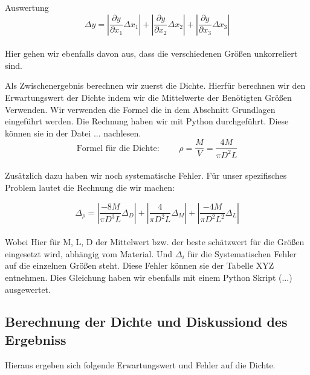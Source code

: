 \documentclass[twoside]{protokoll}
\begin{document}
\begin{aufgabe}{Auswertung}
\begin{equation}
	\Delta y = \left|\frac{\partial y}{\partial x_1}\Delta x_1\right| + 
	\left|\frac{\partial y}{\partial x_2}\Delta x_2\right| + 
	\left|\frac{\partial y}{\partial x_3}\Delta x_3\right|
\end{equation}\\

Hier gehen wir ebenfalls davon aus, dass die verschiedenen Größen unkorreliert sind. 

Als Zwischenergebnis berechnen wir zuerst die Dichte. Hierfür berechnen wir den
Erwartungswert der Dichte indem wir die Mittelwerte der Benötigten Größen Verwenden. 
Wir verwenden die Formel die in dem Abschnitt Grundlagen eingeführt werden. Die Rechnung haben wir mit Python durchgeführt. Diese können sie in der Datei ... nachlesen.\\

\begin{equation}
    \text{Formel für die Dichte: }\qquad \rho = \frac{M}{V} = \frac{4M}{\pi D^2L}
\end{equation}\\

Zusätzlich dazu haben wir noch systematische Fehler. Für unser spezifisches Problem lautet die Rechnung die wir machen:

\begin{equation}
	\Delta_{\rho} = \left|\frac{-8M}{\pi D^3L}\Delta_D\right| + 
	\left|\frac{4}{\pi D^2L}\Delta_M\right| + 
	\left|\frac{-4M}{\pi D^2L^2}\Delta_L\right|
\end{equation}\\

Wobei Hier für M, L, D der Mittelwert bzw. der beste schätzwert für die Größen eingesetzt wird, abhängig 
vom Material. Und $\Delta_i$ für die Systematischen Fehler auf die einzelnen Größen steht. 
Diese Fehler können sie der Tabelle XYZ entnehmen. 
Dies Gleichung haben wir ebenfalls mit einem Python Skript (...)
ausgewertet.

\subsection{Berechnung der Dichte und Diskussiond des Ergebniss}

Hieraus ergeben sich folgende Erwartungswert und Fehler auf die Dichte. 



\end{aufgabe}
\end{document}

